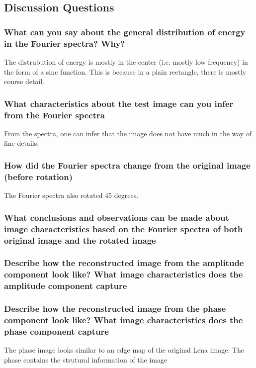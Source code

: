 \documentclass[article, 1.5space, letterpaper, 12pt, oneside, header, footer]{SydeClass}
\begin{document}
\subsection{Discussion Questions}

\subsubsection{What can you say about the general distribution of energy in the Fourier spectra? Why?}
The distrubution of energy is mostly in the center (i.e. mostly low frequency) in the form of a sinc function. This is because in a plain rectangle, there is mostly course detail.

\subsubsection{ What characteristics about the test image can you infer from the Fourier spectra}
From the spectra, one can infer that the image does not have much in the way of fine details.

\subsubsection{How did the Fourier spectra change from the original image (before rotation)}
The Fourier spectra also rotated 45 degrees.

\subsubsection{ What conclusions and observations can be made about image characteristics based on the Fourier
spectra of both original image and the rotated image}


\subsubsection{Describe how the reconstructed image from the amplitude component look like? What image characteristics does the amplitude component capture}



\subsubsection{Describe how the reconstructed image from the phase component look like? What image characteristics does the phase component capture}
The phase image looks similar to an edge map of the original Lena image. The phase contains the strutural information of the image
\end{document}
